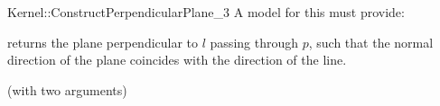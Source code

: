 \begin{ccRefFunctionObjectConcept}{Kernel::ConstructPerpendicularPlane_3}
A model for this must provide:


{returns the plane perpendicular to $l$ passing through $p$,
such that the normal direction of the plane coincides with the direction of
the line.}

\ccRefines
{} (with two arguments)

\ccSeeAlso
{} \\

\end{ccRefFunctionObjectConcept}
